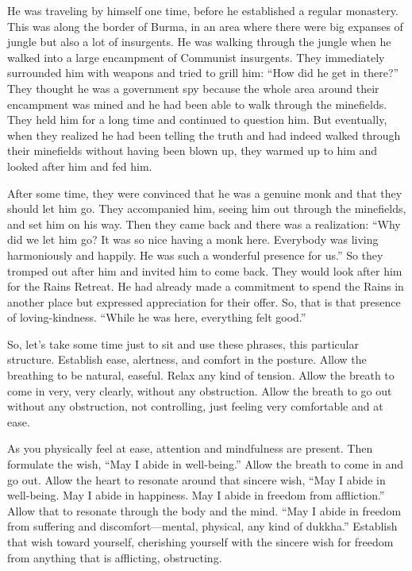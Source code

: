 He was traveling by himself one time, before he established a regular
monastery. This was along the border of Burma, in an area where there
were big expanses of jungle but also a lot of insurgents. He was walking
through the jungle when he walked into a large encampment of Communist
insurgents. They immediately surrounded him with weapons and tried to
grill him: “How did he get in there?” They thought he was a government
spy because the whole area around their encampment was mined and he had
been able to walk through the minefields. They held him for a long time
and continued to question him. But eventually, when they realized he had
been telling the truth and had indeed walked through their minefields
without having been blown up, they warmed up to him and looked after him
and fed him.

After some time, they were convinced that he was a genuine monk and that
they should let him go. They accompanied him, seeing him out through the
minefields, and set him on his way. Then they came back and there was a
realization: “Why did we let him go? It was so nice having a monk here.
Everybody was living harmoniously and happily. He was such a wonderful
presence for us.” So they tromped out after him and invited him to come
back. They would look after him for the Rains Retreat. He had already
made a commitment to spend the Rains in another place but expressed
appreciation for their offer. So, that is that presence of
loving-kindness. “While he was here, everything felt good.”

So, let’s take some time just to sit and use these phrases, this
particular structure. Establish ease, alertness, and comfort in the
posture. Allow the breathing to be natural, easeful. Relax any kind of
tension. Allow the breath to come in very, very clearly, without any
obstruction. Allow the breath to go out without any obstruction, not
controlling, just feeling very comfortable and at ease.

As you physically feel at ease, attention and mindfulness are present.
Then formulate the wish, “May I abide in well-being.” Allow the breath
to come in and go out. Allow the heart to resonate around that sincere
wish, “May I abide in well-being. May I abide in happiness. May I abide
in freedom from affliction.” Allow that to resonate through the body and
the mind. “May I abide in freedom from suffering and discomfort—mental,
physical, any kind of dukkha.” Establish that wish toward yourself,
cherishing yourself with the sincere wish for freedom from anything that
is afflicting, obstructing.

